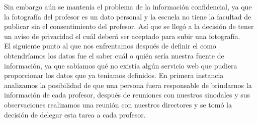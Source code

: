 	 Sin embargo aún se mantenía el problema de la  información confidencial, ya que la fotografía del profesor es un dato personal y  la escuela no tiene la facultad de publicar sin el consentimiento del profesor. Así que se llegó a la decisión de tener un aviso de privacidad el cuál deberá ser aceptado para subir una fotografía.\\
	 
	 El siguiente punto al que nos enfrentamos después de definir el como obtendríamos los datos fue el saber cuál o quién sería nuestra fuente de información, ya que sabíamos qué no existía algún servicio web que pudiera proporcionar los datos que ya teníamos definidos.  En primera instancia analizamos la posibilidad de que una persona fuera responsable de brindarnos la información de cada profesor, después de reuniones con nuestros sinodales y sus observaciones realizamos una reunión con nuestros directores y se tomó la decisión de delegar esta tarea a cada profesor.\\
	 
